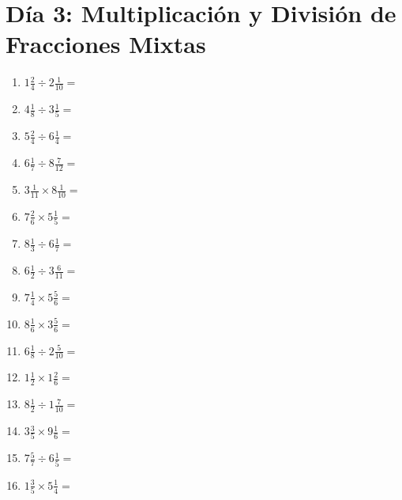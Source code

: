 \documentclass[12pt]{article}
\begin{document}
\section*{Día 3: Multiplicación y División de Fracciones Mixtas}
\begin{enumerate}
\item \large $ 1 \frac{2}{4} \div 2 \frac{1}{10} = $ \vspace{1.6cm}
\item \large $ 4 \frac{1}{8} \div 3 \frac{1}{5} = $ \vspace{1.6cm}
\item \large $ 5 \frac{2}{4} \div 6 \frac{1}{4} = $ \vspace{1.6cm}
\item \large $ 6 \frac{1}{7} \div 8 \frac{7}{12} = $ \vspace{1.6cm}
\item \large $ 3 \frac{1}{11} \times 8 \frac{1}{10} = $ \vspace{1.6cm}
\item \large $ 7 \frac{2}{6} \times 5 \frac{1}{5} = $ \vspace{1.6cm}
\item \large $ 8 \frac{1}{3} \div 6 \frac{1}{7} = $ \vspace{1.6cm}
\item \large $ 6 \frac{1}{2} \div 3 \frac{6}{11} = $ \vspace{1.6cm}
\item \large $ 7 \frac{1}{4} \times 5 \frac{5}{6} = $ \vspace{1.6cm}
\item \large $ 8 \frac{1}{6} \times 3 \frac{5}{6} = $ \vspace{1.6cm}
\newpage
\item \large $ 6 \frac{1}{8} \div 2 \frac{5}{10} = $ \vspace{1.6cm}
\item \large $ 1 \frac{1}{2} \times 1 \frac{2}{6} = $ \vspace{1.6cm}
\item \large $ 8 \frac{1}{2} \div 1 \frac{7}{10} = $ \vspace{1.6cm}
\item \large $ 3 \frac{3}{5} \times 9 \frac{1}{6} = $ \vspace{1.6cm}
\item \large $ 7 \frac{5}{7} \div 6 \frac{1}{5} = $ \vspace{1.6cm}
\item \large $ 1 \frac{3}{5} \times 5 \frac{1}{4} = $ \vspace{1.6cm}

\end{enumerate}
\end{document}
